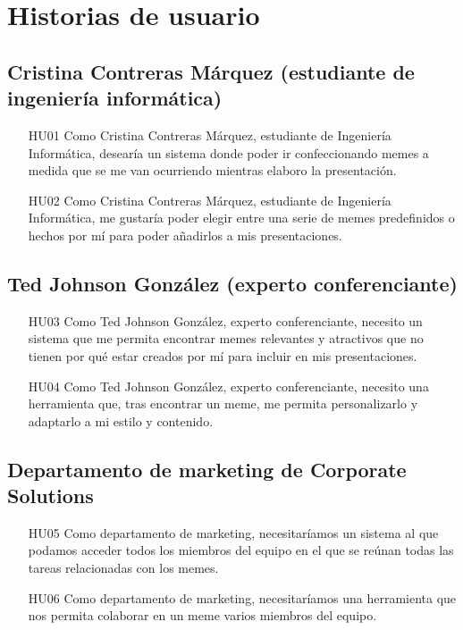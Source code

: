 \section{Historias de usuario}

    \subsection{Cristina Contreras Márquez (estudiante de ingeniería informática)}

        \begin{enumerate}
            \item [HU01] Como Cristina Contreras Márquez, estudiante de Ingeniería Informática, desearía un sistema donde poder ir confeccionando memes a medida que se me van ocurriendo mientras elaboro la presentación.
            \item [HU02] Como Cristina Contreras Márquez, estudiante de Ingeniería Informática, me gustaría poder elegir entre una serie de memes predefinidos o hechos por mí para poder añadirlos a mis presentaciones.
        \end{enumerate}

    \subsection{Ted Johnson González (experto conferenciante)}

        \begin{enumerate}
            \item [HU03] Como Ted Johnson González, experto conferenciante, necesito un sistema que me permita encontrar memes relevantes y atractivos que no tienen por qué estar creados por mí para incluir en mis presentaciones.
            \item [HU04] Como Ted Johnson González, experto conferenciante, necesito una herramienta que, tras encontrar un meme, me permita personalizarlo y adaptarlo a mi estilo y contenido.
        \end{enumerate}

    \subsection{Departamento de marketing de Corporate Solutions}

        \begin{enumerate}
            \item [HU05] Como departamento de marketing, necesitaríamos un sistema al que podamos acceder todos los miembros del equipo en el que se reúnan todas las tareas relacionadas con los memes.
            \item [HU06] Como departamento de marketing, necesitaríamos una herramienta que nos permita colaborar en un meme varios miembros del equipo.
        \end{enumerate}

